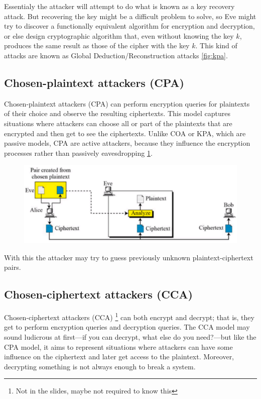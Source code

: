 	Essentialy the attacker will attempt to do what is known as a key recovery attack. But recovering the key might be a difficult problem to solve, so Eve might try to discover a functionally equivalent algorithm for encryption and decryption, or else design cryptographic algorithm that, even without knowing the key $k$, produces the same result as those of the cipher with the key $k$. This kind of attacks are known as Global Deduction/Reconstruction attacks \ref{fig:kpa}.
	
	\subsection{Chosen-plaintext attackers (CPA)}
	Chosen-plaintext attackers (CPA) can perform encryption queries for	plaintexts of their choice and observe the resulting ciphertexts. This model captures situations where attackers can choose all or part of the plaintexts that are encrypted and then get to see the ciphertexts.
	Unlike COA or KPA, which are passive models, CPA are active attackers, because they influence the encryption processes rather than passively eavesdropping \ref{fig:cpa}.
	
	\begin{figure}
		\centering
		\includegraphics[width=0.7\linewidth]{Images/Chapter1/cpa}
		\caption{}
		\label{fig:cpa}
	\end{figure}
	
	With this the attacker may try to guess previously unknown plaintext-ciphertext pairs.
	
	
	\subsection{Chosen-ciphertext attackers (CCA)}
	Chosen-ciphertext attackers (CCA) \footnote{Not in the slides, maybe not required to know this} can both encrypt and decrypt; that is, they get to perform encryption queries and decryption queries. The CCA model may sound ludicrous at first—if you can decrypt, what else do you need?—but like the CPA model, it aims to represent situations where attackers can have some influence on the ciphertext and later get access to the plaintext. Moreover, decrypting something is not always enough to break a system.
	

